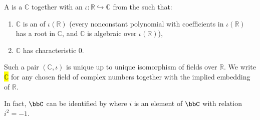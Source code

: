 \begin{definition} \label{definition:field_of_complex_numbers}
    A  is a  $\mathbb{C}$ together with an  $\iota : \mathbb{R} \hookrightarrow \mathbb{C}$ from the  such that:
    \begin{enumerate}
        \item $\mathbb{C}$ is an  of $\iota(\mathbb{R})$ (every nonconstant polynomial with coefficients in $\iota(\mathbb{R})$ has a root in $\mathbb{C}$, and $\mathbb{C}$ is algebraic over $\iota(\mathbb{R})$),
        \item $\mathbb{C}$ has characteristic $0$.
    \end{enumerate}
    Such a pair $(\mathbb{C},\iota)$ is unique up to unique isomorphism of fields over $\mathbb{R}$.
    We write \hl{$\mathbb{C}$} for any chosen field of complex numbers together with the implied embedding of $\mathbb{R}$.

    In fact, $\bbC$ can be identified by  where $i$ is an element of $\bbC$ with relation $i^2 = -1$.
\end{definition}
